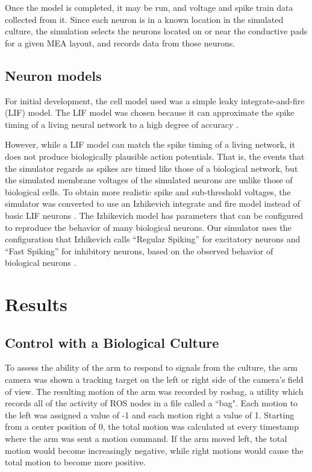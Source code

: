 \documentclass[letterpaper]{article}
\begin{document}
Once the model is completed, it may be run, and voltage and spike train data collected from it. 
Since each neuron is in a known location in the simulated culture, the simulation selects the neurons located on or near the conductive pads for a given MEA layout, and records data from those neurons. 

\subsection{Neuron models}

For initial development, the cell model used was a simple leaky integrate-and-fire (LIF) model. 
The LIF model was chosen because it can approximate the spike timing of a living neural network to a high degree of accuracy \cite{kahng2007stochastic,jolivet2004generalized}. 

However, while a LIF model can match the spike timing of a living network, it does not produce biologically plausible action potentials. 
That is, the events that the simulator regards as spikes are timed like those of a biological network, but the simulated membrane voltages of the simulated neurons are unlike those of biological cells. 
To obtain more realistic spike and sub-threshold voltages, the simulator was converted to use an Izhikevich integrate and fire model instead of basic LIF neurons \cite{izhikevich2003simple}.
The Izhikevich model has parameters that can be configured to reproduce the behavior of many biological neurons. 
Our simulator uses the configuration that Izhikevich calls ``Regular Spiking'' for excitatory neurons and ``Fast Spiking'' for inhibitory neurons, based on the observed behavior of biological neurons \cite{Izhikevich01082004}.

\section{Results}

\subsection{Control with a Biological Culture} 

To assess the ability of the arm to respond to signals from the culture, the arm camera was shown a tracking target on the left or right side of the camera's field of view.
The resulting motion of the arm was recorded by rosbag, a utility which records all of the activity of ROS nodes in a file called a ``bag". 
Each motion to the left was assigned a value of -1 and each motion right a value of 1. 
Starting from a center position of 0, the total motion was calculated at every timestamp where the arm was sent a motion command. 
If the arm moved left, the total motion would become increasingly negative, while right motions would cause the total motion to become more positive. 
\end{document}
